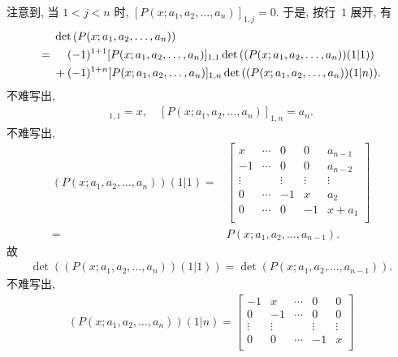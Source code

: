 \begin{example}
    注意到, 当 \(1 < j < n\) 时,
    \([P(x; a_1, a_2, \dots, a_n)]_{1,j} = 0\).
    于是, 按行~\(1\) 展开, 有
    \begin{align*}
             &
        \det {(P(x; a_1, a_2, \dots, a_n))}
        \\
        = {} &
        \hphantom{{} + {}}
        (-1)^{1+1} [P(x; a_1, a_2, \dots, a_n)]_{1,1}
        \det {((P(x; a_1, a_2, \dots, a_n))(1|1))}
        \\
             &
        + (-1)^{1+n} [P(x; a_1, a_2, \dots, a_n)]_{1,n}
        \det {((P(x; a_1, a_2, \dots, a_n))(1|n))}.
    \end{align*}
    不难写出,
    \begin{align*}
        [P(x; a_1, a_2, \dots, a_n)]_{1,1} = x,
        \quad
        [P(x; a_1, a_2, \dots, a_n)]_{1,n} = a_n.
    \end{align*}
    不难写出,
    \begin{align*}
        (P(x; a_1, a_2, \dots, a_n))(1|1)
        = {} &
        \begin{bmatrix}
            x      & \cdots & 0      & 0      & a_{n-1} \\
            -1     & \cdots & 0      & 0      & a_{n-2} \\
            \vdots & {}     & \vdots & \vdots & \vdots  \\
            0      & \cdots & -1     & x      & a_2     \\
            0      & \cdots & 0      & -1     & x + a_1 \\
        \end{bmatrix}
        \\
        = {} &
        P(x; a_1, a_2, \dots, a_{n-1}).
    \end{align*}
    故
    \begin{align*}
        \det {((P(x; a_1, a_2, \dots, a_n))(1|1))}
        = \det {(P(x; a_1, a_2, \dots, a_{n-1}))}.
    \end{align*}
    不难写出,
    \begin{align*}
        (P(x; a_1, a_2, \dots, a_n))(1|n)
        = \begin{bmatrix}
              -1     & x      & \cdots & 0      & 0      \\
              0      & -1     & \cdots & 0      & 0      \\
              \vdots & \vdots & {}     & \vdots & \vdots \\
              0      & 0      & \cdots & -1     & x      \\

\end{bmatrix}
\end{align*}
\end{example}
